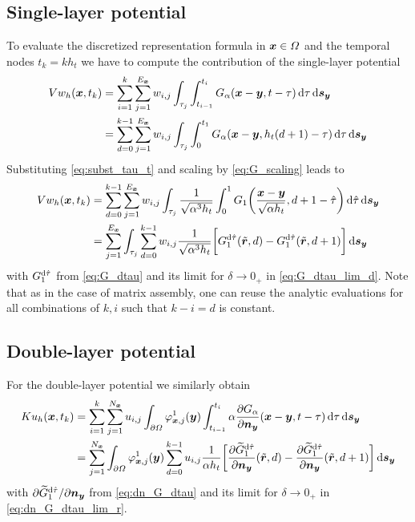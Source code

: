 \documentclass[a4paper,11pt]{article}
\begin{document}
\subsection{Single-layer potential}

To evaluate the discretized representation formula in ${{\bm{x}}}\in\Omega$ and the temporal nodes $t_k = k h_t$ we have to compute the contribution of the single-layer potential
\begin{align*}
 Vw_h({{\bm{x}}}, t_k) &= \sum_{i=1}^{k} \sum_{j=1}^{E_{{\bm{x}}}} w_{i,j} \int_{\tau_j} \int_{t_{i-1}}^{t_i} G_\alpha({{\bm{x}}}-{{\bm{y}}},t-\tau) \,{\mathrm{d}}\tau \,{\mathrm{d}}{{\bm{s}}}_{{\bm{y}}} \\
 &= \sum_{d=0}^{k-1} \sum_{j=1}^{E_{{\bm{x}}}} w_{i,j} \int_{\tau_j} \int_{0}^{t_1} G_\alpha({{\bm{x}}}-{{\bm{y}}},h_t(d+1)-\tau) \,{\mathrm{d}}\tau \,{\mathrm{d}}{{\bm{s}}}_{{\bm{y}}}
\end{align*}
Substituting \eqref{eq:subst_tau_t} and scaling by \eqref{eq:G_scaling} leads to
\begin{align*}
  Vw_h({{\bm{x}}}, t_k) &= \sum_{d=0}^{k-1} \sum_{j=1}^{E_{{\bm{x}}}} w_{i,j} \int_{\tau_j} \frac{1}{\sqrt{\alpha^3 h_t}}\int_0^1 G_1\bigg(\frac{{{\bm{x}}}-{{\bm{y}}}}{\sqrt{\alpha h_t}},d+1-\hat\tau\bigg) \,{\mathrm{d}}\hat\tau \,{\mathrm{d}}{{\bm{s}}}_{{\bm{y}}} \\
  &= \sum_{j=1}^{E_{{\bm{x}}}} \int_{\tau_j} \sum_{d=0}^{k-1} w_{i,j} \frac{1}{\sqrt{\alpha^3 h_t}} \bigg[ G_1^{{\mathrm{d}}\hat\tau}(\tilde {{{\bm{r}}}}, d) - G_1^{{\mathrm{d}}\hat\tau}(\tilde {{{\bm{r}}}}, d+1) \bigg] \,{\mathrm{d}}{{\bm{s}}}_{{\bm{y}}}
\end{align*}
with $G_1^{{\mathrm{d}}\hat\tau}$ from \eqref{eq:G_dtau} and its limit for $\delta \to 0_+$ in \eqref{eq:G_dtau_lim_d}. Note that as in the case of matrix assembly, one can reuse the analytic evaluations for all combinations of $k,i$ such that $k-i=d$ is constant.

\subsection{Double-layer potential}

For the double-layer potential we similarly obtain
\begin{align*}
  Ku_h({{\bm{x}}}, t_k) &= \sum_{i=1}^{k} \sum_{j=1}^{N_{{\bm{x}}}} u_{i,j} \int_{\partial\Omega} \varphi^1_{{{\bm{x}}},j}({{\bm{y}}}) \int_{t_{i-1}}^{t_i} \alpha \frac{\partial G_\alpha}{\partial {\ensuremath{{\bm{n}}}}_{{\bm{y}}}}({{\bm{x}}}-{{\bm{y}}},t-\tau) \,{\mathrm{d}}\tau \,{\mathrm{d}}{{\bm{s}}}_{{\bm{y}}} \\
  &= \sum_{j=1}^{N_{{\bm{x}}}} \int_{\partial\Omega} \varphi^1_{{{\bm{x}}},j}({{\bm{y}}}) \sum_{d=0}^{k-1} u_{i,j} \frac{1}{\alpha h_t} \bigg[ \frac{\partial \widetilde G_1^{{\mathrm{d}}\hat\tau}}{\partial {\ensuremath{{\bm{n}}}}_{{\bm{y}}}}(\tilde {{{\bm{r}}}}, d) - \frac{\partial \widetilde G_1^{{\mathrm{d}}\hat\tau}}{\partial {\ensuremath{{\bm{n}}}}_{{\bm{y}}}}(\tilde {{{\bm{r}}}}, d+1) \bigg] \,{\mathrm{d}}{{\bm{s}}}_{{\bm{y}}}
\end{align*}
with $\partial \widetilde G_1^{{\mathrm{d}}\hat\tau} / \partial {\ensuremath{{\bm{n}}}}_{{\bm{y}}}$ from \eqref{eq:dn_G_dtau} and its limit for $\delta \to 0_+$ in \eqref{eq:dn_G_dtau_lim_r}.

\newpage


\end{document}
